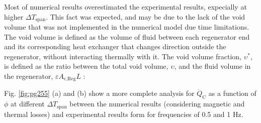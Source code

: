 \documentclass[review,preprint,12pt]{elsarticle}
\begin{document}
Most of numerical results overestimated the experimental results, expecially at higher $\Delta T_\textrm{span}$. This fact was expected, and may be due to the lack of the void volume \cite{Trevizoli2015,LeiPHD} that was not implemented in the numerical model due time limitations. The void volume is defined as the volume of fluid between each regenerator end and its corresponding heat exchanger that changes direction outside the regenerator, without interacting thermally with it. The void volume fraction, $\upsilon^*$, is defined as the ratio between the total void volume, $\upsilon$, and the fluid volume in the regenerator, $\varepsilon A_\textrm{c,Reg} L$ \cite{Trevizoli2015}:

Fig. \ref{fig:pg255} (a) and (b) show a more complete analysis for $\dot{Q}_\textrm{C}$ as a function of $\phi$ at different $\Delta T_\textrm{span}$ between the numerical results (considering magnetic and thermal losses) and experimental results form \cite{Trevizoli2015} for frequencies of 0.5 and 1 Hz.
\end{document}
